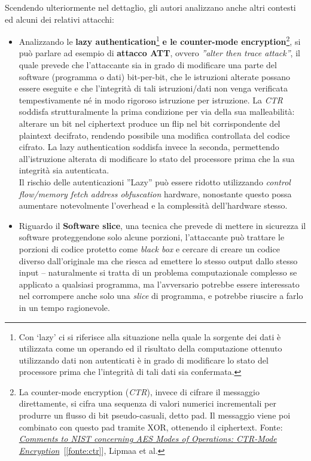 Scendendo ulteriormente nel dettaglio, gli autori analizzano anche altri contesti ed alcuni dei relativi attacchi:
\begin{itemize}
   \item Analizzando le \textbf{lazy authentication}\footnote{Con `lazy' ci si riferisce alla situazione nella quale la sorgente dei dati è utilizzata come un operando ed il risultato della computazione ottenuto utilizzando dati non autenticati è in grado di modificare lo stato del processore prima che l'integrità di 
    tali dati sia confermata.} \textbf{e le counter-mode encryption}\footnote{La counter-mode encryption (\textit{CTR}), invece di cifrare il messaggio direttamente, si cifra una sequenza di valori numerici incrementali per produrre un flusso di bit pseudo-casuali, detto pad. Il messaggio viene poi combinato con questo pad tramite XOR, ottenendo il ciphertext. 
    Fonte: \hyperref[fonte:ctr]{\textit{Comments to NIST concerning AES Modes of Operations: CTR-Mode Encryption}}~[\ref{fonte:ctr}], Lipmaa et al.}, si può parlare ad esempio di \textbf{attacco ATT}, ovvero \textit{''alter then trace attack''}, il quale prevede che l'attaccante sia in grado di modificare una parte del software 
    (programma o dati) bit-per-bit, che le istruzioni alterate possano essere eseguite e che l'integrità di tali istruzioni/dati non venga verificata tempestivamente né in modo rigoroso istruzione per istruzione. La \textit{CTR} soddisfa strutturalmente la prima condizione per via della sua malleabilità: alterare un bit nel ciphertext produce un flip nel bit corrispondente del plaintext decifrato, rendendo possibile una modifica controllata del codice cifrato. La lazy authentication soddisfa invece la seconda, permettendo all'istruzione alterata di modificare lo stato del processore prima che la sua integrità sia autenticata.\\
    Il rischio delle autenticazioni ''Lazy'' può essere ridotto utilizzando \textit{control flow/memory fetch address obfuscation} hardware, nonostante questo possa aumentare notevolmente l'overhead e la complessità dell'hardware stesso.
    \item Riguardo il \textbf{Software slice}, una tecnica che prevede di mettere in sicurezza il software proteggendone solo alcune porzioni, l'attaccante può trattare le porzioni di codice protetto come \textit{black box} e cercare di creare un codice diverso dall'originale ma che riesca ad emettere lo stesso output dallo stesso input -- 
    naturalmente si tratta di un problema computazionale complesso se applicato a qualsiasi programma, ma l'avversario potrebbe essere interessato nel corrompere anche solo una \textit{slice} di programma, e potrebbe riuscire a farlo in un tempo ragionevole. 

\end{itemize}
